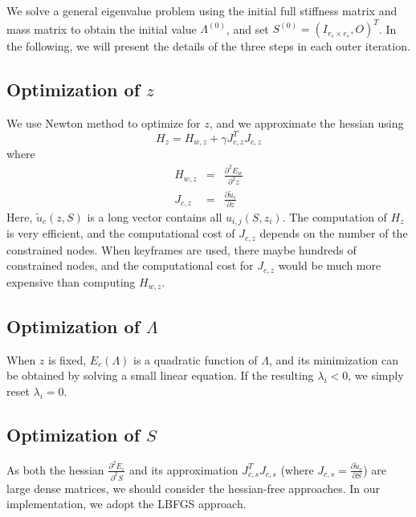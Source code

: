 \documentclass[9pt,twocolumn]{extarticle}
\begin{document}
We solve a general eigenvalue problem using the initial full stiffness matrix
and mass matrix to obtain the initial value $\Lambda^{(0)}$, and set
$S^{(0)}=(I_{r_s\times r_s},O)^T$. In the following, we will present the details
of the three steps in each outer iteration.

\subsection{Optimization of $z$}
We use Newton method to optimize for $z$, and we approximate the hessian using
\begin{equation} 
  H_z = H_{w,z}+\gamma J_{c,z}^TJ_{c,z}
\end{equation}
where
\begin{eqnarray}
  H_{w,z} &=& \frac{\partial^2{E_w}}{\partial^2{z}}\\
  J_{c,z} &=& \frac{\partial{\tilde{u}_c}}{\partial{z}}
\end{eqnarray}
Here, $\tilde{u}_c(z,S)$ is a long vector contains all $u_{i,j}(S,z_i)$. The computation
of $H_z$ is very efficient, and the computational cost of $J_{c,z}$ depends on
the number of the constrained nodes. When keyframes are used, there maybe
hundreds of constrained nodes, and the computational cost for $J_{c,z}$ would be
much more expensive than computing $H_{w,z}$.

\subsection{Optimization of $\Lambda$}
When $z$ is fixed, $E_c(\Lambda)$ is a quadratic function of $\Lambda$, and its
minimization can be obtained by solving a small linear equation. If the
resulting $\lambda_i<0$, we simply reset $\lambda_i=0$. 

\subsection{Optimization of $S$}
As both the hessian $\frac{\partial^2{E_c}}{\partial^2{S}}$ and its
approximation $J_{c,s}^TJ_{c,s}$ (where $J_{c,s} =
\frac{\partial{\tilde{u}_c}}{\partial{S}}$) are large dense matrices, we should
consider the hessian-free approaches. In our implementation, we adopt the LBFGS
approach.

\appendix
\end{document}
